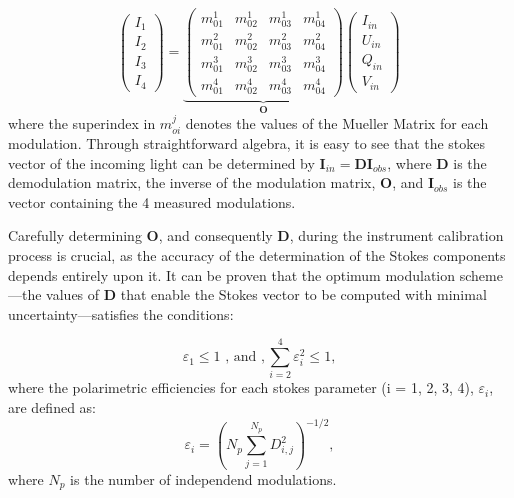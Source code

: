\begin{equation}
  \begin{pmatrix}
  I _ 1 \\
  I _ 2 \\
  I _ 3 \\
  I _ 4
  \end{pmatrix} = 
  \underbrace{\begin{pmatrix} 
      m ^ 1 _ {01} & m ^ 1 _ {02} & m ^ 1 _ {03} & m ^ 1 _ {04} \\ 
      m ^ 2 _ {01} & m ^ 2 _ {02} & m ^ 2 _ {03} & m ^ 2 _ {04} \\
      m ^ 3 _ {01} & m ^ 3 _ {02} & m ^ 3 _ {03} & m ^ 3 _ {04} \\
      m ^ 4 _ {01} & m ^ 4 _ {02} & m ^ 4 _ {03} & m ^ 4 _ {04} 
  \end{pmatrix}}_ {\textbf{O}}
  \begin{pmatrix}
    I _ {in} \\
    U _ {in} \\
    Q _ {in} \\
    V _ {in}
    \end{pmatrix} \, 
    \label{eq_spectro_theory: stokes_linear_comb}
\end{equation}
where the superindex in $m ^j _{oi}$ denotes the values of the Mueller Matrix for each modulation. Through straightforward algebra, it is easy to see that the stokes vector of the incoming light can be determined by $\textbf{I}_{in} = \textbf{D}\textbf{I}_{obs}$, where $\textbf{D}$ is the demodulation matrix, the inverse of the modulation matrix, $\textbf{O}$, and $\textbf{I}_{obs}$ is the vector containing the 4 measured modulations. 

Carefully determining $\textbf{O}$, and consequently $\textbf{D}$, during the instrument calibration process is crucial, as the accuracy of the determination of the Stokes components depends entirely upon it. It can be proven \citep{optimum_modulation} that the optimum modulation scheme—the values of $\textbf{D}$ that enable the Stokes vector to be computed with minimal uncertainty—satisfies the conditions:

\begin{equation}
  \varepsilon _ 1 \leqslant 1 \text{     , and     }, \sum _ {i = 2} ^4 \varepsilon _ i ^2 \leqslant 1,
  \label{eq_intro:optimum_efficiencies}
\end{equation}
where the polarimetric efficiencies for each stokes parameter (i = 1, 2, 3, 4), $\varepsilon _ i$, are defined as:
\begin{equation}
  \varepsilon _ i = \left( N_p \sum _ {j = 1} ^ {N_p} D _ {i, j} ^2\right) ^{-1/2},
  \label{eq_intro: polarimetric_efficiencies_definition}
\end{equation}
where $N_p$ is the number of independend modulations. 

